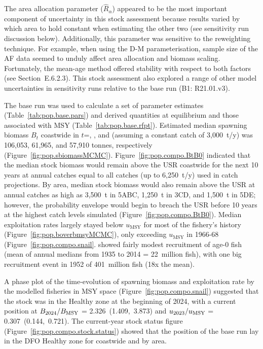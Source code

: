 \documentclass[11pt]{book}
\newcommand{\Bmsy}{B_\text{MSY}}
\newcommand{\umsy}{u_\text{MSY}}
\newcommand{\code}[1]{\texttt{#1}}
\begin{document}
The area allocation parameter ($\widehat{R}_{\alpha}$) appeared to be the most important component of uncertainty in this stock assessment because results varied by which area to hold constant when estimating the other two (see sensitivity run discussion below).
Additionally, this parameter was sensitive to the reweighting technique.
For example, when using the D-M parameterisation, sample size of the AF data seemed to unduly affect area allocation and biomass scaling.
Fortunately, the \citet{Francis:2011} mean-age method offered stability with respect to both factors (see Section~E.6.2.3).
This stock assessment also explored a range of other model uncertainties in sensitivity runs relative to the base run (B1: R21.01.v3).

The base run was used to calculate a set of parameter estimates (Table~\ref{tab:pop.base.pars}) and derived quantities at equilibrium and those associated with MSY (Table~\ref{tab:pop.base.rfpt}).
Estimated median spawning biomass $B_t$ coastwide in $t$=\startYear, \currYear, and \projYear{} (assuming a constant catch of 3,000~t/y) was 106,053, 61,965, and 57,910 tonnes, respectively (Figure~\ref{fig:pop.sbiomassMCMC}).
Figure~\ref{fig:pop.compo.BtB0} indicated that the median stock biomass would remain above the USR coastwide for the next 10 years at annual catches equal to all catches (up to 6,250~t/y) used in catch projections.
By area, median stock biomass would also remain above the USR at annual catches as high as 3,500~t in 5ABC, 1,250~t in 3CD, and 1,500~t in 5DE; however, the probability envelope would begin to breach the USR before 10 years at the highest catch levels simulated (Figure~\ref{fig:pop.compo.BtB0}).
Median exploitation rates largely stayed below $\umsy$ for most of the fishery's history (Figure~\ref{fig:pop.boverbmsyMCMC}), only exceeding $\umsy$ in 1966-68 (Figure~\ref{fig:pop.compo.snail}.
\SPC{} showed fairly modest recruitment of age-0 fish (mean of annual medians from 1935 to 2014 = 22~million fish), with one big recruitment event in 1952 of 401~million fish (18x the mean).

A phase plot of the time-evolution of spawning biomass and exploitation rate by the modelled fisheries in MSY space (Figure~\ref{fig:pop.compo.snail}) suggested that the stock was in the Healthy zone at the beginning of 2024, with a current position at $B_{\currYear}/\Bmsy$ = 2.326~(1.409,~3.873)
and $u_{\prevYear}/\umsy$ = 0.307~(0.144,~0.721).
The current-year stock status figure (Figure~\ref{fig:pop.compo.stock.status}) showed that the position of the base run lay in the DFO Healthy zone for \SPC{} coastwide and by area.
\end{document}
